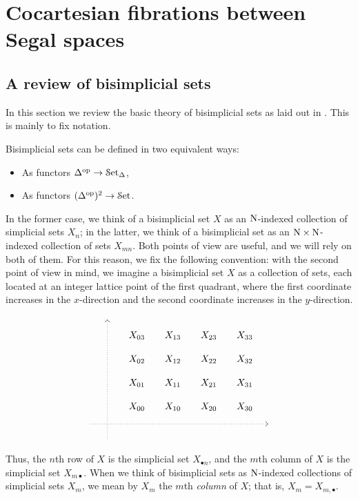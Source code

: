 \documentclass[main.tex]{subfiles}
\begin{document}
\section{Cocartesian fibrations between Segal spaces}
\label{sec:cocartesian_fibrations_between_complete_segal_spaces}

\subsection{A review of bisimplicial sets}
\label{ssc:a_review_of_bisimplicial_sets}

In this section we review the basic theory of bisimplicial sets as laid out in \cite{qcats_vs_segal_spaces}. This is mainly to fix notation.

Bisimplicial sets can be defined in two equivalent ways:
\begin{itemize}
  \item As functors $\Delta^{\mathrm{op}} \to \mathcal{S}\mathrm{et}_{\Delta}$,

  \item As functors $(\Delta^{\mathrm{op}})^{2} \to \mathcal{S}\mathrm{et}$.
\end{itemize}
In the former case, we think of a bisimplicial set $X$ as an $\mathrm{N}$-indexed collection of simplicial sets $X_{n}$; in the latter, we think of a bisimplicial set as an $\mathrm{N} \times \mathrm{N}$-indexed collection of sets $X_{mn}$. Both points of view are useful, and we will rely on both of them. For this reason, we fix the following convention: with the second point of view in mind, we imagine a bisimplicial set $X$ as a collection of sets, each located at an integer lattice point of the first quadrant, where the first coordinate increases in the $x$-direction and the second coordinate increases in the $y$-direction.
\begin{equation*}
  \begin{tikzcd}[row sep=small, column sep=small]
    & \
    \arrow[dddddd, leftarrow, dotted, at start]
    \\
    && X_{03}
    & X_{13}
    & X_{23}
    & X_{33}
    \\
    && X_{02}
    & X_{12}
    & X_{22}
    & X_{32}
    \\
    && X_{01}
    & X_{11}
    & X_{21}
    & X_{31}
    \\
    && X_{00}
    & X_{10}
    & X_{20}
    & X_{30}
    \\
    \
    \arrow[rrrrrr, dotted, at end]
    &&&&&& \
    \\
    & \
  \end{tikzcd}
\end{equation*}
Thus, the $n$th row of $X$ is the simplicial set $X_{\bullet n}$, and the $m$th column of $X$ is the simplicial set $X_{m \bullet}$. When we think of bisimplicial sets as $\mathrm{N}$-indexed collections of simplicial sets $X_{m}$, we mean by $X_{m}$ the $m$th \emph{column} of $X$; that is, $X_{m} = X_{m, \bullet}$.
\end{document}
